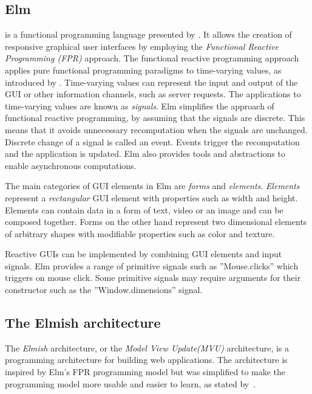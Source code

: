 \subsection{Elm}
\citet{eml} is a functional programming language presented by \citet{Czaplicki_Chong_2013}.
It allows the creation of responsive graphical user interfaces by employing the
\emph{Functional Reactive Programming (FPR)} approach.
The functional reactive programming approach applies pure functional programming paradigms to time-varying values, as introduced by \citet{Elliott_Hudak_1997}.
Time-varying values can represent the input and output of the GUI or other information
channels, such as server requests. The applications to time-varying values are known
as \emph{signals}. Elm simplifies the approach of functional reactive programming,
by assuming that the signals are discrete. This means that it avoids unnecessary
recomputation when the signals are unchanged. Discrete change of a signal is called
an event. Events trigger the recomputation and the application is updated. Elm also
provides tools and abstractions to enable asynchronous computations.

The main categories of GUI elements in Elm are \emph{forms} and \emph{elements}.
\emph{Elements} represent a \emph{rectangular} GUI element with properties such as width and height. Elements
can contain data in a form of text, video or an image and can be composed together.
Forms on the other hand represent two dimensional elements of arbitrary shapes with
modifiable properties such as color and texture.

Reactive GUIs can be implemented by combining GUI elements and input signals.
Elm provides a range of primitive signals such as ”Mouse.clicks” which triggers on
mouse click. Some primitive signals may require arguments for their constructor such
as the ”Window.dimensions” signal.

\subsection{The Elmish architecture}
\label{sub:elmish}

The \emph{Elmish} architecture, or the \emph{Model View Update(MVU)} architecture, is a programming architecture for building web applications.
The architecture is inspired by Elm's FPR programming model but was simplified to make the programming model more usable and easier to learn, as stated by~\citet{news/farewell-to-frp_2024}.

